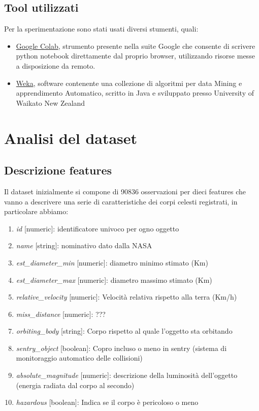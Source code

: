 \documentclass[italian,12pt,a4paper]{article}
\begin{document}
	\subsection{Tool utilizzati}
	Per la sperimentazione sono stati usati diversi stumenti, quali:
	
		\begin{itemize}
			\item \href{https://colab.research.google.com/}{Google Colab}, strumento  presente nella suite Google che consente di scrivere python notebook direttamente dal proprio browser, utilizzando risorse messe a disposizione da remoto. 
			\item \href{https://www.cs.waikato.ac.nz/~ml/weka/}{Weka}, software contenente una collezione di algoritmi per data Mining e apprendimento Automatico, scritto in Java e sviluppato presso University of Waikato New Zealand
			
		\end{itemize}


	\section{Analisi del dataset}
	
	\subsection{Descrizione features}
	Il dataset inizialmente si compone di 90836 osservazioni per dieci features che vanno a descrivere una serie di caratteristiche dei corpi celesti registrati, in particolare abbiamo:
	
	\begin{enumerate}
		\item \textit{id} [numeric]: identificatore univoco per ogno oggetto
		\item \textit{name} [string]: nominativo dato dalla NASA
		\item \textit{est\_diameter\_min} [numeric]: diametro minimo stimato (Km)
		\item \textit{est\_diameter\_max} [numeric]: diametro massimo stimato (Km)
		\item \textit{relative\_velocity} [numeric]: Velocità relativa rispetto alla terra (Km/h)
		\item \textit{miss\_distance }[numeric]: ???
		\item \textit{orbiting\_body} [string]: Corpo rispetto al quale l’oggetto sta orbitando
		\item \textit{sentry\_object} [boolean]: Copro incluso o meno in sentry (sistema di monitoraggio automatico delle collisioni)
		\item \textit{absolute\_magnitude} [numeric]: descrizione della luminosità dell’oggetto (energia radiata dal corpo al secondo)
		\item \textit{hazardous} [boolean]: Indica se il corpo è pericoloso o meno
	\end{enumerate}
	
\end{document}
